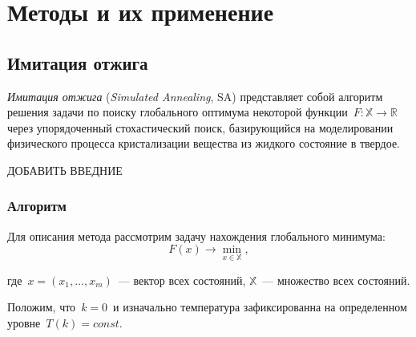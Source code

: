 \chapter{Методы и их применение} \label{chap2}

\section{Имитация отжига}

\noindent
\textit{Имитация отжига} (\emph{Simulated Annealing}, SA) представляет собой алгоритм решения задачи по поиску глобального оптимума некоторой функции~$F\colon \mathbb{X} \to \mathbb{R}$ через упорядоченный стохастический поиск, базирующийся на моделировании физического процесса кристализации вещества из жидкого состояние в твердое.

ДОБАВИТЬ ВВЕДНИЕ

\subsection{Алгоритм}

\noindent Для описания метода рассмотрим задачу нахождения глобального минимума:
\[
	F(x) \to \min \limits _{x \in \mathbb{X}},
\]

\noindent где~$x = (x_{1},\ldots , x_{m})$~--- вектор всех состояний, $\mathbb{X}$~--- множество всех состояний.

Положим, что~$k = 0$~и изначально температура зафиксированна на определенном уровне~$T(k) = const$.



